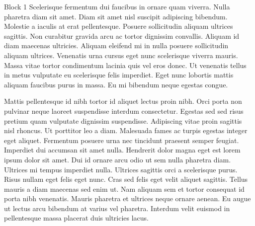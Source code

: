 \documentclass[final,dvipdfmx,t]{beamer}
\begin{document}
\begin{frame}
\begin{columns}
\begin{column}{0.485\textwidth}
\begin{block}{Block 1}
				Scelerisque fermentum dui faucibus in ornare quam viverra. Nulla pharetra diam sit amet. Diam sit amet nisl suscipit adipiscing bibendum. Molestie a iaculis at erat pellentesque. Posuere sollicitudin aliquam ultrices sagittis. Non curabitur gravida arcu ac tortor dignissim convallis. Aliquam id diam maecenas ultricies. Aliquam eleifend mi in nulla posuere sollicitudin aliquam ultrices. Venenatis urna cursus eget nunc scelerisque viverra mauris. Massa vitae tortor condimentum lacinia quis vel eros donec. Ut venenatis tellus in metus vulputate eu scelerisque felis imperdiet. Eget nunc lobortis mattis aliquam faucibus purus in massa. Eu mi bibendum neque egestas congue.

Mattis pellentesque id nibh tortor id aliquet lectus proin nibh. Orci porta non pulvinar neque laoreet suspendisse interdum consectetur. Egestas sed sed risus pretium quam vulputate dignissim suspendisse. Adipiscing vitae proin sagittis nisl rhoncus. Ut porttitor leo a diam. Malesuada fames ac turpis egestas integer eget aliquet. Fermentum posuere urna nec tincidunt praesent semper feugiat. Imperdiet dui accumsan sit amet nulla. Hendrerit dolor magna eget est lorem ipsum dolor sit amet. Dui id ornare arcu odio ut sem nulla pharetra diam. Ultrices mi tempus imperdiet nulla. Ultrices sagittis orci a scelerisque purus. Risus nullam eget felis eget nunc. Cras sed felis eget velit aliquet sagittis. Tellus mauris a diam maecenas sed enim ut. Nam aliquam sem et tortor consequat id porta nibh venenatis. Mauris pharetra et ultrices neque ornare aenean. Eu augue ut lectus arcu bibendum at varius vel pharetra. Interdum velit euismod in pellentesque massa placerat duis ultricies lacus.


\end{block}
\end{column}
\end{columns}
\end{frame}
\end{document}
